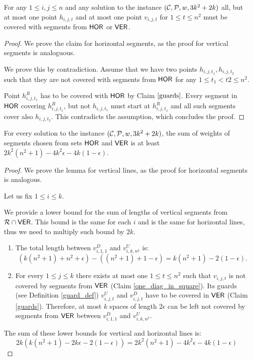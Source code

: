 \begin{claim}
\label{one_diag_in_square}
For any $1 \le i, j \le n$
and any solution to the instance $(\mathcal{C}, \mathcal{P}, w, 3k^2+2k)$
all, but at most one point $h_{i, j, t}$
and at most one point $v_{i, j, t}$
for $1 \le t \le n^2$
must be
covered with segments from $\mathsf{HOR}$ or $\mathsf{VER}$.
\end{claim}

\begin{proof}
We prove the claim for horizontal segments,
as the proof for vertical segments is analoguous.

We prove this by contradiction. Assume that we
have two points $h_{i,j,t_1}, h_{i,j,t_2}$
such that they are not covered with segments from $\mathsf{HOR}$
for any $1 \le t_1 < t2 \le n^2$.

Point $h^R_{i, j, t_1}$ has to be covered with $\mathsf{HOR}$
by Claim $\ref{guards}$.
Every segment in $\mathsf{HOR}$ covering $h^R_{i, j, t_1}$,
but not $h_{i,j,t_1}$ must start at $h^R_{i, j, t_1}$
and all such segments cover also $h_{i, j, t_2}$.
This contradicts the assumption, which concludes the proof.
\end{proof}

\begin{lemma}
\label{vertical_horizontal_sum}
For every solution to the instance $(\mathcal{C}, \mathcal{P}, w, 3k^2+2k)$,
the sum of weights of segments chosen
from sets $\mathsf{HOR}$ and $\mathsf{VER}$ is at least
$2k^2(n^2+1) -4k^2\epsilon -4k(1-\epsilon)$.
\end{lemma}

\begin{proof}
We prove the lemma for vertical lines,
as the proof for horizontal segments is analogous.

Let us fix $1 \le i \le k$.

We provide a lower bound for the sum of lengths
of vertical segments from $\mathcal{R} \cap \mathsf{VER}$.
This bound is the same for each $i$ and is the same
for horizontal lines, thus we need to multiply such bound by $2k$.

\begin{enumerate}[label={(\arabic*)}]
\item The total length between $v^D_{i, 1, 1}$ and $v^U_{i, k, n^2}$ is:
$$(k(n^2+1) + n^2 +\epsilon) - ((n^2+1)+1 -\epsilon) = k(n^2+1) - 2(1 - \epsilon).$$

\item For every $1 \le j \le k$ there exists at most one $1 \le t \le n^2$
such that $v_{i,j,t}$ is not covered by segments from $\mathsf{VER}$
(Claim \ref{one_diag_in_square}).
Its guards (see Definition \ref{guard_def}) $v^U_{i,j,t}$ and $v^D_{i,j,t}$
have to be covered in $\mathsf{VER}$ (Claim \ref{guards}).
Therefore, at most $k$ spaces of length $2\epsilon$ can be left
not covered by segments from $\mathsf{VER}$ between $v_{i,1,1}^D$ and $v_{i,k,n^2}^U$.

\end{enumerate}
The sum of these lower bounds for vertical and horizontal lines is:
$$2k(k(n^2+1) -2k\epsilon -2(1-\epsilon)) = 2k^2(n^2+1) -4k^2\epsilon -4k(1-\epsilon)$$
\end{proof}

